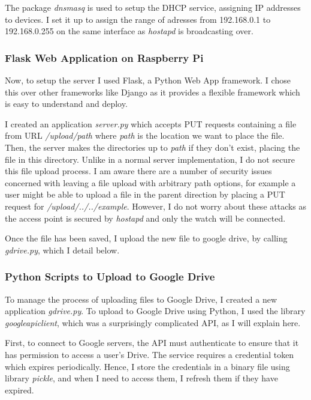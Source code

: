 \documentclass[12pt,a4paper,twoside,openright]{report}
\begin{document}
The package \emph{dnsmasq} is used to setup the DHCP service, assigning IP
addresses to devices. I set it up to assign the range of adresses from 192.168.0.1 to
192.168.0.255 on the same interface as \emph{hostapd} is broadcasting over.

\subsubsection{Flask Web Application on Raspberry Pi}

Now, to setup the server I used Flask, a Python Web App framework. I chose
this over other frameworks like Django as it provides a flexible framework
which is easy to understand and deploy.

I created an application \emph{server.py} which
accepts PUT requests containing a file from URL \emph{/upload/path} where
\emph{path} is the location we want to place the file. Then, the server
makes the directories up to \emph{path} if they don't exist, placing the file
in this directory. Unlike in a normal server implementation, I do not secure
this file upload process. I am aware there are a number of security issues
concerned with leaving a file upload with arbitrary path options, for example
a user might be able to upload a file in the parent direction by placing a PUT
request for \emph{/upload/../../example}. However, I do not worry about these
attacks as the access point is secured by \emph{hostapd} and only the watch
will be connected.

Once the file has been saved, I upload the new file to google drive, by
calling \emph{gdrive.py}, which I detail below.

\subsubsection{Python Scripts to Upload to Google Drive}

To manage the process of uploading files to Google Drive, I created a new
application \emph{gdrive.py}. To upload to Google Drive using Python, I used
the library \emph{googleapiclient}, which was a surprisingly complicated API,
as I will explain here.

First, to connect to Google servers, the API must authenticate to ensure that
it has permission to access a user's Drive. The service requires a credential
token which expires periodically. Hence, I store the credentials in a binary
file using library \emph{pickle}, and when I need to access them, I 
refresh them if they have expired.
\end{document}
